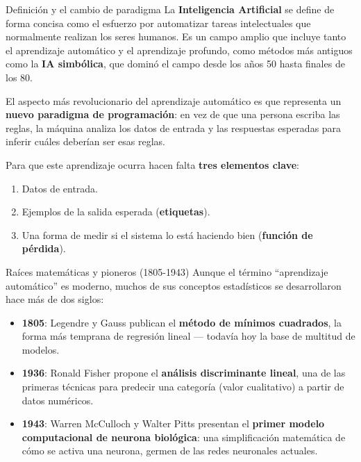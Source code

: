 \documentclass[aspectratio=169]{beamer}
\begin{document}
\begin{frame}{Definición y el cambio de paradigma}
  La \textbf{Inteligencia Artificial} se define de forma concisa como el esfuerzo por automatizar tareas intelectuales que normalmente realizan los seres humanos. Es un campo amplio que incluye tanto el aprendizaje automático y el aprendizaje profundo, como métodos más antiguos como la \textbf{IA simbólica}, que dominó el campo desde los años 50 hasta finales de los 80.

  El aspecto más revolucionario del aprendizaje automático es que representa un \textbf{nuevo paradigma de programación}: en vez de que una persona escriba las reglas, la máquina analiza los datos de entrada y las respuestas esperadas para inferir cuáles deberían ser esas reglas.

  Para que este aprendizaje ocurra hacen falta \textbf{tres elementos clave}:
  \begin{enumerate}
    \item Datos de entrada.
    \item Ejemplos de la salida esperada (\textbf{etiquetas}).
    \item Una forma de medir si el sistema lo está haciendo bien (\textbf{función de pérdida}).
  \end{enumerate}
\end{frame}

\begin{frame}{Raíces matemáticas y pioneros (1805-1943)}
  Aunque el término ``aprendizaje automático'' es moderno, muchos de sus conceptos estadísticos se desarrollaron hace más de dos siglos:
  \begin{itemize}
    \item \textbf{1805}: Legendre y Gauss publican el \textbf{método de mínimos cuadrados}, la forma más temprana de regresión lineal --- todavía hoy la base de multitud de modelos.
    \item \textbf{1936}: Ronald Fisher propone el \textbf{análisis discriminante lineal}, una de las primeras técnicas para predecir una categoría (valor cualitativo) a partir de datos numéricos.
    \item \textbf{1943}: Warren McCulloch y Walter Pitts presentan el \textbf{primer modelo computacional de neurona biológica}: una simplificación matemática de cómo se activa una neurona, germen de las redes neuronales actuales.
  \end{itemize}
\end{frame}
\end{document}
